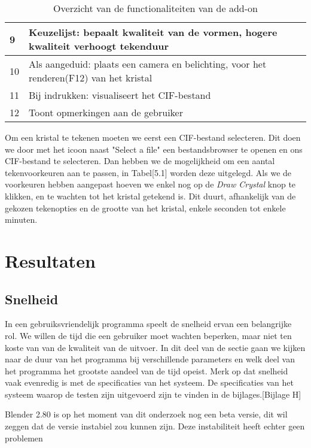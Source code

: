 \begin{table}[H]
\begin{tabular}{|l|l|}
9  & Keuzelijst: bepaalt kwaliteit van de vormen, hogere kwaliteit verhoogt tekenduur                                                                                                                                                                                     \\ \hline
10 & Als aangeduid: plaats een camera en belichting, voor het renderen(F12) van het kristal                                                                                                                                                                               \\ \hline
11 & Bij indrukken: visualiseert het CIF-bestand                                                                                                                                                                                                                          \\ \hline
12 & Toont opmerkingen aan de gebruiker                                                                                                                                                                                                                                   \\ \hline
\end{tabular}
\caption{Overzicht van de functionaliteiten van de add-on}
\end{table}

Om een kristal te tekenen moeten we eerst een CIF-bestand selecteren. Dit doen we door met het icoon naast "Select a file" een bestandsbrowser te openen en ons CIF-bestand te selecteren. Dan hebben we de mogelijkheid om een aantal tekenvoorkeuren aan te passen, in Tabel[5.1] worden deze uitgelegd. Als we de voorkeuren hebben aangepast hoeven we enkel nog op de \textit{Draw Crystal} knop te klikken, en te wachten tot het kristal getekend is. Dit duurt, afhankelijk van de gekozen tekenopties en de grootte van het kristal, enkele seconden tot enkele minuten.
\par
  
\section{Resultaten}

\subsection{Snelheid}

In een gebruiksvriendelijk programma speelt de snelheid ervan een belangrijke rol. We willen de tijd die een gebruiker moet wachten beperken, maar niet ten koste van van de kwaliteit van de uitvoer. In dit deel van de sectie gaan we kijken naar de duur van het programma bij verschillende parameters en welk deel van het programma het grootste aandeel van de tijd opeist. Merk op dat snelheid vaak evenredig is met de specificaties van het systeem. De specificaties van het systeem waarop de testen zijn uitgevoerd zijn te vinden in de bijlages.[Bijlage H]  




Blender 2.80 is op het moment van dit onderzoek nog een beta versie, dit wil zeggen dat de versie instabiel zou kunnen zijn. Deze instabiliteit heeft echter geen problemen 
   